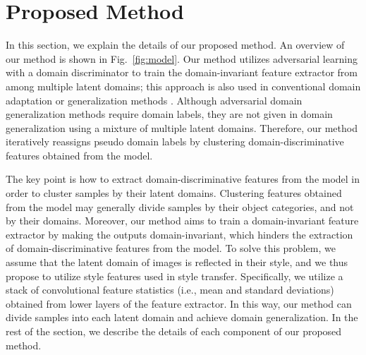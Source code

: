 \documentclass[letterpaper]{article} \usepackage{aaai20}  \usepackage{times}  \usepackage{helvet} \usepackage{courier}  \usepackage[hyphens]{url}  \usepackage{graphicx} \urlstyle{rm} \def\UrlFont{\rm}  \usepackage{graphicx}  \usepackage[whole]{bxcjkjatype}
\begin{document}
\section{Proposed Method}
In this section, we explain the details of our proposed method. An overview of our method is shown in Fig.~\ref{fig:model}. Our method utilizes adversarial learning with a domain discriminator to train the domain-invariant feature extractor from among multiple latent domains; this approach is also used in conventional domain adaptation or generalization methods \cite{GRL,CIDDG}. Although adversarial domain generalization methods require domain labels, they are not given in domain generalization using a mixture of multiple latent domains. Therefore, our method iteratively reassigns pseudo domain labels by clustering domain-discriminative features obtained from the model.\par
The key point is how to extract domain-discriminative features from the model in order to cluster samples by their latent domains. Clustering features obtained from the model may generally divide samples by their object categories, and not by their domains. Moreover, our method aims to train a domain-invariant feature extractor by making the outputs domain-invariant, which hinders the extraction of domain-discriminative features from the model. To solve this problem, we assume that the latent domain of images is reflected in their style, and we thus propose to utilize style features used in style transfer. Specifically, we utilize a stack of convolutional feature statistics (i.e., mean and standard deviations) obtained from lower layers of the feature extractor. In this way, our method can divide samples into each latent domain and achieve domain generalization. In the rest of the section, we describe the details of each component of our proposed method.
\end{document}
